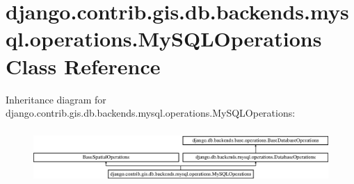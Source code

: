 \hypertarget{classdjango_1_1contrib_1_1gis_1_1db_1_1backends_1_1mysql_1_1operations_1_1_my_s_q_l_operations}{}\section{django.\+contrib.\+gis.\+db.\+backends.\+mysql.\+operations.\+My\+S\+Q\+L\+Operations Class Reference}
\label{classdjango_1_1contrib_1_1gis_1_1db_1_1backends_1_1mysql_1_1operations_1_1_my_s_q_l_operations}
Inheritance diagram for django.\+contrib.\+gis.\+db.\+backends.\+mysql.\+operations.\+My\+S\+Q\+L\+Operations\+:\begin{figure}[H]
\begin{center}
\leavevmode
\includegraphics[height=2.079208cm]{classdjango_1_1contrib_1_1gis_1_1db_1_1backends_1_1mysql_1_1operations_1_1_my_s_q_l_operations}
\end{center}
\end{figure}
